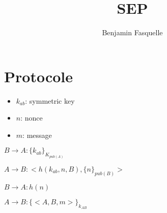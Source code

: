 \documentclass[10pt,a4paper]{article}
\author{Benjamin Fasquelle}
\title{SEP}
\begin{document}
\maketitle


\section{Protocole}

\begin{itemize}
\item $k_{ab}$: symmetric key
\item $n$: nonce
\item $m$: message
\end{itemize}

$B \rightarrow A: \{k_{ab}\}_{K_{pub(A)}}$


$A \rightarrow B: <h(k_{ab}, n, B), \{n\}_{pub(B)} > $

$B \rightarrow A: h(n)$


$A \rightarrow B: \{<A, B, m>\}_{k_{AB}}$
\end{document}
